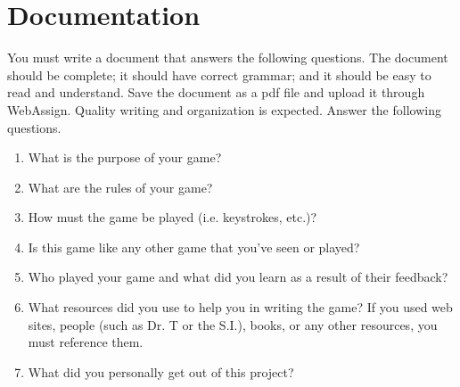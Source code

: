 \section*{Documentation}

You must write a document that answers the following questions. The document should be complete; it should have correct grammar; and it should be easy to read and understand. Save the document as a pdf file and upload it through WebAssign. Quality writing and organization is expected. Answer the following questions.

\begin{enumerate}
	\item What is the purpose of your game?
	\item What are the rules of your game?
	\item How must the game be played (i.e. keystrokes, etc.)?
	\item Is this game like any other game that you've seen or played?
	\item Who played your game and what did you learn as a result of their feedback?
	\item What resources did you use to help you in writing the game?  If you used web sites, people (such as Dr. T or the S.I.), books, or any other resources, you must reference them.
	\item What did you personally get out of this project?
\end{enumerate}
